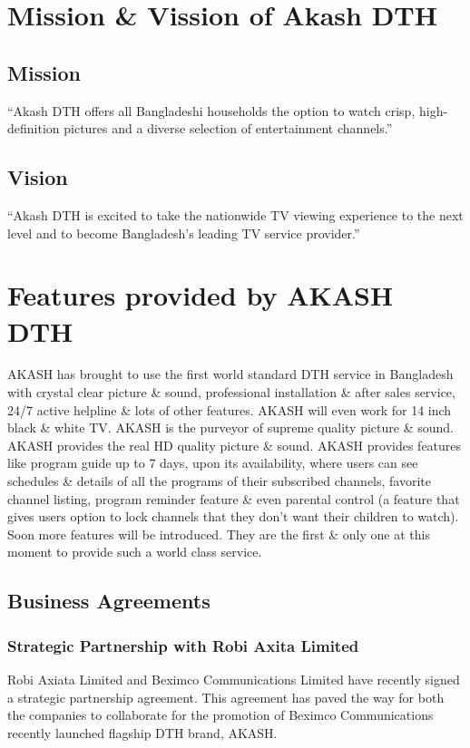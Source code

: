 \begin{spacing}{1.0}
\section{Mission \& Vission of Akash DTH}
\subsection{Mission}
“Akash DTH offers all Bangladeshi households the option to watch crisp, high-definition pictures and a diverse selection of entertainment channels.” 
\subsection{Vision}
“Akash DTH is excited to take the nationwide TV viewing experience to the next level and to become Bangladesh's leading TV service provider.” 

\section{Features provided by AKASH DTH}
AKASH has brought to use the first world standard DTH service in Bangladesh with crystal clear picture \& sound, professional installation \& after sales service, 24/7 active helpline \& lots of other features. AKASH will even work for 14 inch black \& white TV. AKASH is the purveyor of supreme quality picture \& sound.  AKASH provides the real HD quality picture \& sound. AKASH provides features like program guide up to 7 days, upon its availability, where users can see schedules \& details of all the programs of their subscribed channels, favorite channel listing, program reminder feature \& even parental control (a feature that gives users option to lock channels that they don't want their children to watch). Soon more features will be introduced. They are the first \& only one at this moment to provide such a world class service.
\subsection{Business Agreements}
\subsubsection{Strategic Partnership with Robi Axita Limited}
Robi Axiata Limited and Beximco Communications Limited have recently signed a strategic partnership agreement. This agreement has paved the way for both the companies to collaborate for the promotion of Beximco Communications recently launched flagship DTH brand, AKASH.

\end{spacing}
